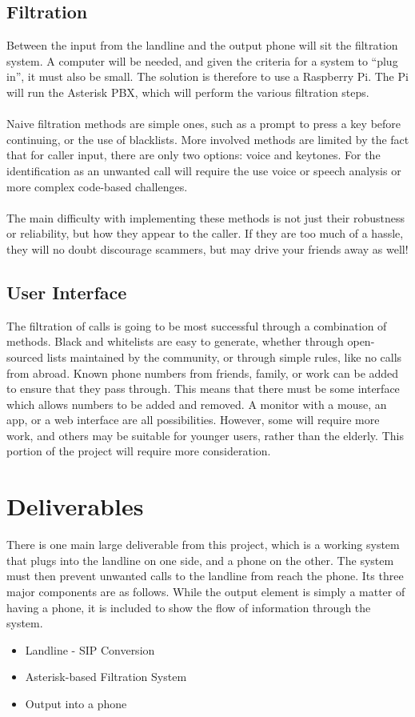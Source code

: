 \documentclass[12pt,a4paper]{report}
\begin{document}
\subsection{Filtration}
Between the input from the landline and the output phone will sit the filtration system. A computer will be needed, and given the criteria for a system to ``plug in'', it must also be small. The solution is therefore to use a Raspberry Pi. The Pi will run the Asterisk PBX, which will perform the various filtration steps.
\\\\
Naive filtration methods are simple ones, such as a prompt to press a key before continuing, or the use of blacklists. More involved methods are limited by the fact that for caller input, there are only two options: voice and keytones. For the identification as an unwanted call will require the use voice or speech analysis or more complex code-based challenges.
\\\\
The main difficulty with implementing these methods is not just their robustness or reliability, but how they appear to the caller. If they are too much of a hassle, they will no doubt discourage scammers, but may drive your friends away as well!

\subsection{User Interface}
The filtration of calls is going to be most successful through a combination of methods. Black and whitelists are easy to generate, whether through open-sourced lists maintained by the community, or through simple rules, like no calls from abroad. Known phone numbers from friends, family, or work can be added to ensure that they pass through. This means that there must be some interface which allows numbers to be added and removed. A monitor with a mouse, an app, or a web interface are all possibilities. However, some will require more work, and others may be suitable for younger users, rather than the elderly. This portion of the project will require more consideration.

\section{Deliverables}
There is one main large deliverable from this project, which is a working system that plugs into the landline on one side, and a phone on the other. The system must then prevent unwanted calls to the landline from reach the phone. Its three major components are as follows. While the output element is simply a matter of having a phone, it is included to show the flow of information through the system.
\begin{itemize}
  \item Landline - SIP Conversion
  \item Asterisk-based Filtration System
  \item Output into a phone
\end{itemize}
\end{document}

